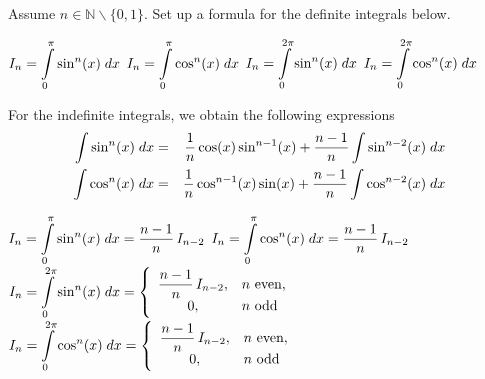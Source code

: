 \fi

\ifanalysis
\begin{Exercise}[difficulty = 2]
Assume $n \in \mathbb{N}\backslash \{0,1 \}$. Set up a formula for the definite integrals below. 
\begin{multicols}{2}
    \Question $I_{n} = \displaystyle \int\limits_0^{\pi} \sin^n (x) \; dx $
     \Question $I_{n} = \displaystyle \int\limits_0^{\pi} \cos^n (x) \; dx $
    \Question $I_{n} = \displaystyle \int\limits_0^{2\pi} \sin^n (x) \; dx $
    \Question $I_{n} = \displaystyle \int\limits_0^{2\pi} \cos^n (x) \; dx $
    \EndCurrentQuestion
\end{multicols}
\end{Exercise}

\begin{Answer}
    For the indefinite integrals, we obtain the following expressions
    \begin{eqnarray*}
     \displaystyle \int \sin^n (x) \; dx &=& \dfrac{1}{n} \cos(x) \sin^{n-1}(x) + \dfrac{n-1}{n}  \displaystyle \int\sin^{n-2} (x) \; dx \\
     \displaystyle \int \cos^n (x) \; dx &=& \dfrac{1}{n} \cos^{n-1}(x) \sin(x)  + \dfrac{n-1}{n}  \displaystyle \int\cos^{n-2} (x) \; dx 
    \end{eqnarray*}
    
        \Question $I_{n} = \displaystyle \int\limits_0^{\pi} \sin^n (x) \; dx = \dfrac{n-1}{n} \, I_{n-2} $
         \Question $I_{n} = \displaystyle \int\limits_0^{\pi} \cos^n (x) \; dx =  \dfrac{n-1}{n}\, I_{n-2} $
        \Question $I_{n} = \displaystyle \int\limits_0^{2\pi} \sin^n (x) \; dx = \left\{ \begin{array}{cl}
        \dfrac{n-1}{n} \, I_{n-2}, & n \text{ even}, \\
        0, & n \text{ odd}
        \end{array} \right.$
        \Question $I_{n} = \displaystyle \int\limits_0^{2\pi} \cos^n (x) \; dx = \left\{ \begin{array}{cl}
        \dfrac{n-1}{n}\, I_{n-2}, & n \text{ even}, \\
        0, & n \text{ odd}
        \end{array} \right.$
    
\end{Answer}
\fi






